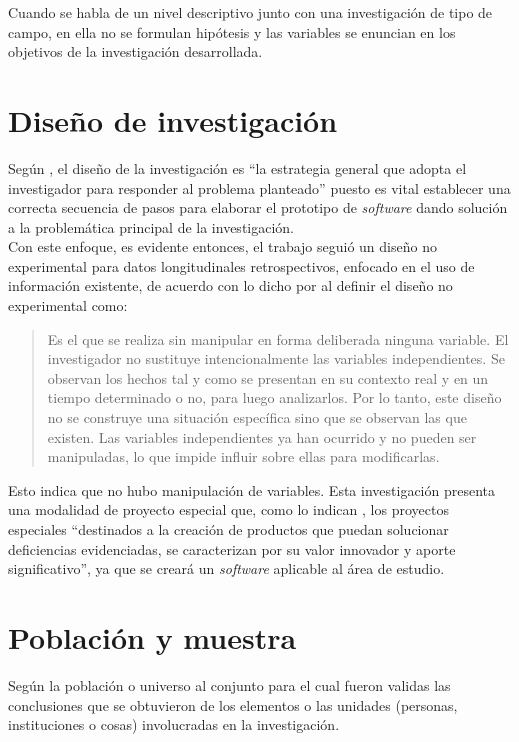 	Cuando se habla de un nivel descriptivo junto con una investigaci\'on de tipo de campo, en ella no se formulan hip\'otesis y las variables se enuncian en los objetivos de la investigaci\'on desarrollada.
	
\section{Dise\~no de investigaci\'on}
	
	Seg\'un \citet{arias}, el dise\~no de la investigaci\'on es “la estrategia general que adopta el investigador para responder al problema planteado”  puesto es vital establecer una correcta secuencia de pasos para elaborar el prototipo de  \textit{software}  dando soluci\'on a la problem\'atica principal de la investigaci\'on. \\
	
	Con este enfoque, es evidente entonces, el trabajo segui\'o un dise\~no no experimental para datos longitudinales retrospectivos, enfocado en el uso de informaci\'on existente, de acuerdo con lo dicho por  \citet{pallela} al definir el dise\~no no experimental como:

\begin{quote}
Es el que se realiza sin manipular en forma deliberada ninguna variable. El investigador no sustituye intencionalmente las variables independientes. Se observan los hechos tal y como se presentan en su contexto real y en un tiempo determinado o no, para luego analizarlos. Por lo tanto, este dise\~no no se construye una situaci\'on espec\'ifica sino que se observan las que existen. Las variables independientes ya han ocurrido y no pueden ser manipuladas, lo que impide influir sobre ellas para modificarlas. 
\end{quote}

	Esto indica que no hubo manipulaci\'on de variables. Esta investigaci\'on presenta una modalidad de proyecto especial que, como lo indican \citet{pallela}, los proyectos especiales “destinados a la creaci\'on de productos que puedan solucionar deficiencias evidenciadas, se caracterizan por su valor innovador y aporte significativo”, ya que se crear\'a un \textit{software} aplicable al \'area de estudio.

\section{Poblaci\'on y muestra}

Seg\'un \citet{morles} la poblaci\'on o universo al conjunto para el cual fueron validas las conclusiones que se obtuvieron de los elementos o las unidades (personas, instituciones o cosas) involucradas en la investigaci\'on.\\

